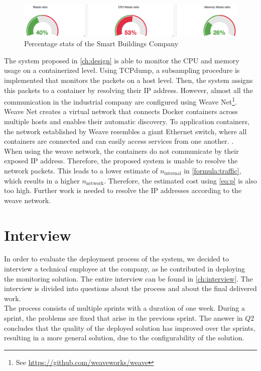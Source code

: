 \begin{figure}
    \centering
    \includegraphics[width=\textwidth]{gfx/stats_percentage.png}
    \caption{Percentage stats of the Smart Buildings Company}
    \label{fig:stats_percentage}
\end{figure}

\noindent
The system proposed in \autoref{ch:design} is able to monitor the CPU and memory usage on a containerized level. Using TCPdump, a subsampling procedure is implemented that monitors the packets on a host level. Then, the system assigns this packets to a container by resolving their IP address. However, almost all the communication in the industrial company are configured using Weave Net\footnote{See \url{https://github.com/weaveworks/weave}}. Weave Net creates a virtual network that connects Docker containers across multiple hosts and enables their automatic discovery. To application containers, the network established by Weave resembles a giant Ethernet switch, where all containers are connected and can easily access services from one another. \cite{weave}.\\

\noindent
When using the weave network, the containers do not communicate by their exposed IP address. Therefore, the proposed system is unable to resolve the network packets. This leads to a lower estimate of $n_\text{internal}$ in \autoref{formula:traffic}, which results in a higher $n_\text{network}$. Therefore, the estimated cost using \autoref{eq:p} is also too high. Further work is needed to resolve the IP addresses according to the weave network.


\section{Interview} \label{sec:sb-interview}
In order to evaluate the deployment process of the system, we decided to interview a technical employee at the company, as he contributed in deploying the monitoring solution. The entire interview can be found in \autoref{ch:interview}. The interview is divided into questions about the process and about the final delivered work.\\

\noindent
The process consists of multiple sprints with a duration of one week. During a sprint, the problems are fixed that arise in the previous sprint. The answer in $Q2$ concludes that the quality of the deployed solution has improved over the sprints, resulting in a more general solution, due to the configurability of the solution.\\

